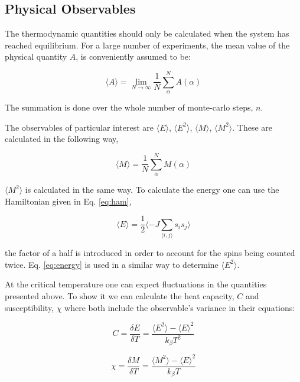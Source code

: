 \subsection{Physical Observables}

The thermodynamic quantities should only be calculated when the system has reached equilibrium. For a large number of experiments, the mean value of the physical quantity $A$, is conveniently assumed to be:

\begin{equation}
	\langle A \rangle = \lim_{N \to \infty} \frac{1}{N} \sum^{N}_{\alpha} A(\alpha)
\end{equation}

The summation is done over the whole number of monte-carlo steps, $n$.

The observables of particular interest are $\langle E \rangle$, $\langle E^2 \rangle$, $\langle M \rangle$, $\langle M^2 \rangle$. These are calculated in the following way,

\begin{equation}
	 \langle M \rangle  = \frac{1}{N} \sum^{N}_{\alpha} M(\alpha)
\end{equation}

$\langle  M^2 \rangle$ is calculated in the same way. To calculate the energy one can use the Hamiltonian given in Eq. \ref{eq:ham},

\begin{equation}
\label{eq:energy}
	\langle E \rangle = \frac{1}{2} \langle -J \sum_{\langle i,j \rangle} s_{i} s_{j} \rangle
\end{equation}

the factor of a half is introduced in order to account for the spins being counted
twice. Eq. \ref{eq:energy} is used in a similar way to determine $\langle E^2 \rangle$.


At the critical temperature one can expect fluctuations in the quantities presented above. To show it we can calculate the heat capacity, $C$ and susceptibility, $\chi$ where both include the observable's variance in their equations:

\begin{equation}
	C = \frac{\delta E}{\delta T}  = \frac{\langle E^2 \rangle - \langle E \rangle^2}{k_{\beta}T^2}
\end{equation}

\begin{equation}
	\chi = \frac{\delta M}{\delta T} = \frac{\langle M^2 \rangle - \langle E \rangle^2}{k_{\beta}T}
\end{equation}

